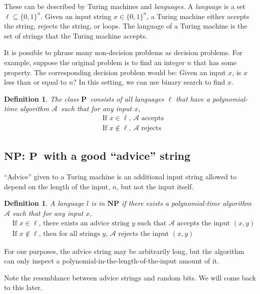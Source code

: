 \documentclass[11pt]{article}
\newcommand{\Pt}{\ensuremath{\mathbf{P}}}
\newcommand{\NP}{\ensuremath{\mathbf{NP}}}
\newcommand{\Alg}{\ensuremath{\mathcal{A}}}
\newtheorem{definition}[theorem]{Definition}
\begin{document}
These can be described by Turing machines and \textit{languages}. A \textit{language}  is a set $\ell \subseteq \{0,1\}^n$. Given an input string $x \in \{0,1\}^n$, a Turing machine either accepts the string, rejects the string, or loops. The language of a Turing machine is the set of strings that the Turing machine accepts.

It is possible to phrase many non-decision problems as decision problems. For example, suppose the original problem is to find an integer $n$ that has some property. The corresponding decision problem would be: Given an input $x$, is $x$ less than or equal to $n$? In this setting, we can use binary search to find $x$.

\begin{definition}
The class \Pt\ consists of all languages $\ell$ that have a polynomial-time algorithm \Alg\ such that for any input $x$,
\begin{align*}
  &\text{If $x \in \ell$, $\Alg$ accepts} \\
  &\text{If $x \not\in \ell$, $\Alg$ rejects}
\end{align*}
\end{definition}

\subsection{\NP: \Pt\ with a good ``advice'' string}

``Advice'' given to a Turing machine is an additional input string allowed to depend on the length of the input, $n$, but not the input itself.

\begin{definition}
A language $l$ is in $\NP$ if there exists a polynomial-time algorithm $\Alg$ such that for any input $x$,
\begin{align*}
  &\text{If $x \in \ell$, there exists an advice string $y$ such that $\Alg$ accepts the input $(x,y)$} \\
  &\text{If $x \not\in \ell$, then for all strings $y$, $\Alg$ rejects the input $(x,y)$}
\end{align*}
\end{definition}

For our purposes, the advice string may be arbitrarily long, but the algorithm can only inspect a polynomial-in-the-length-of-the-input amount of it.

Note the resemblance between advice strings and random bits. We will come back to this later.
\end{document}
